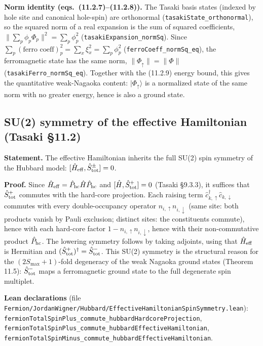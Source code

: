 \documentclass[a4paper,11pt]{article}
\begin{document}
\medskip
\noindent\textbf{Norm identity (eqs.~(11.2.7)--(11.2.8)).}
The Tasaki basis states (indexed by hole site and canonical hole-spin) are
orthonormal (\texttt{tasakiState\_orthonormal}), so the squared norm of a
real expansion is the sum of squared coefficients,
\(\|\sum_p \phi_p \Phi_p\|^2 = \sum_p \phi_p^2\)
(\texttt{tasakiExpansion\_normSq}). Since
\(\sum_p (\text{ferro coeff})_p^2 = \sum_x \xi_x^2 = \sum_p \phi_p^2\)
(\texttt{ferroCoeff\_normSq\_eq}), the ferromagnetic state has the same norm,
\(\|\Phi_\uparrow\| = \|\Phi\|\) (\texttt{tasakiFerro\_normSq\_eq}). Together
with the (11.2.9) energy bound, this gives the quantitative weak-Nagaoka
content: \(|\Phi_\uparrow\rangle\) is a normalized state of the same norm with
no greater energy, hence is also a ground state.

\subsection{SU(2) symmetry of the effective Hamiltonian (Tasaki §11.2)}
\label{subsec:hubbard-effham-su2}

\noindent\textbf{Statement.}
The effective Hamiltonian inherits the full SU(2) spin symmetry of the Hubbard
model: \([\hat H_{\rm eff}, \hat S^\pm_{\rm tot}] = 0\).

\medskip
\noindent\textbf{Proof.}
Since \(\hat H_{\rm eff} = \hat P_{\rm hc}\hat H\hat P_{\rm hc}\) and
\([\hat H, \hat S^+_{\rm tot}] = 0\) (Tasaki §9.3.3), it suffices that
\(\hat S^+_{\rm tot}\) commutes with the hard-core projection. Each raising term
\(\hat c^\dagger_{k,\uparrow}\hat c_{k,\downarrow}\) commutes with every
double-occupancy operator \(n_{i,\uparrow}n_{i,\downarrow}\) (same site: both
products vanish by Pauli exclusion; distinct sites: the constituents commute),
hence with each hard-core factor \(1 - n_{i,\uparrow}n_{i,\downarrow}\), hence
with their non-commutative product \(\hat P_{\rm hc}\). The lowering symmetry
follows by taking adjoints, using that \(\hat H_{\rm eff}\) is Hermitian and
\((\hat S^+_{\rm tot})^\dagger = \hat S^-_{\rm tot}\). This SU(2) symmetry is the
structural reason for the \((2S_{\max}+1)\)-fold degeneracy of the weak Nagaoka
ground states (Theorem 11.5): \(\hat S^-_{\rm tot}\) maps a ferromagnetic ground
state to the full degenerate spin multiplet.

\medskip
\noindent\textbf{Lean declarations}
(file \texttt{Fermion/JordanWigner/Hubbard/EffectiveHamiltonianSpinSymmetry.lean}):
\texttt{fermionTotalSpinPlus\_commute\_hubbardHardcoreProjection},
\texttt{fermionTotalSpinPlus\_commute\_hubbardEffectiveHamiltonian},
\texttt{fermionTotalSpinMinus\_commute\_hubbardEffectiveHamiltonian}.
\end{document}

